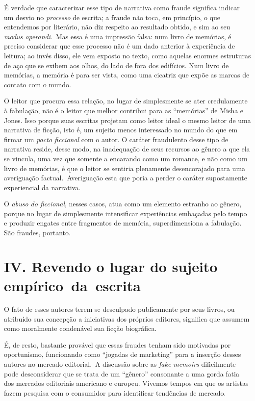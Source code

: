 É verdade que caracterizar esse tipo de narrativa como fraude significa
indicar um desvio no \emph{processo} de escrita; a fraude não toca, em
princípio, o que entendemos por literário, não diz respeito ao resultado
obtido, e sim ao seu \emph{modus operandi}.~Mas essa é uma impressão
falsa: num livro de memórias, é preciso considerar que esse processo não
é um dado anterior à experiência de leitura; ao invés disso, ele vem
exposto no texto, como aquelas enormes estruturas de aço que se exibem
aos olhos, do lado de fora dos edifícios. Num livro de memórias, a
memória é para ser vista, como uma cicatriz que expõe as marcas de
contato com o mundo.

O leitor que procura essa relação, no lugar de simplesmente se ater
credulamente à fabulação, não é o leitor que melhor contribui para as
``memórias'' de Misha e Jones. Isso porque suas escritas projetam como
leitor ideal o mesmo leitor de uma narrativa de ficção, isto é, um
sujeito menos interessado no mundo do que em firmar um \emph{pacto
ficcional} com o autor. O caráter fraudulento desse tipo de narrativa
reside, desse modo, na inadequação de seus recursos ao gênero a que ela
se vincula, uma vez que somente a encarando como um romance, e não como
um livro de memórias, é que o leitor se sentiria plenamente
desencorajado para uma averiguação factual.~Averiguação esta que poria a
perder o caráter supostamente experiencial da narrativa.

O \emph{abuso do ficcional}, nesses casos, atua como um elemento
estranho ao gênero, porque no lugar de simplesmente intensificar
experiências embaçadas pelo tempo e produzir engates entre fragmentos de
memória, superdimensiona a fabulação. São fraudes, portanto.

\section*{IV. Revendo o lugar do sujeito empírico~da~escrita}

O fato de esses autores terem se desculpado publicamente por seus
livros, ou atribuído sua concepção a iniciativas dos próprios editores,
significa que assumem como moralmente condenável sua ficção biográfica.

É, de resto, bastante provável que essas fraudes tenham sido motivadas
por oportunismo, funcionando como ``jogadas de marketing'' para a
inserção desses autores no mercado editorial.~A discussão sobre as
\emph{fake memoirs} dificilmente pode desconsiderar que se trata de um
``gênero'' consonante a uma gorda fatia dos mercados editoriais
americano e europeu. Vivemos tempos em que os artistas fazem pesquisa
com o consumidor para identificar tendências de mercado.

